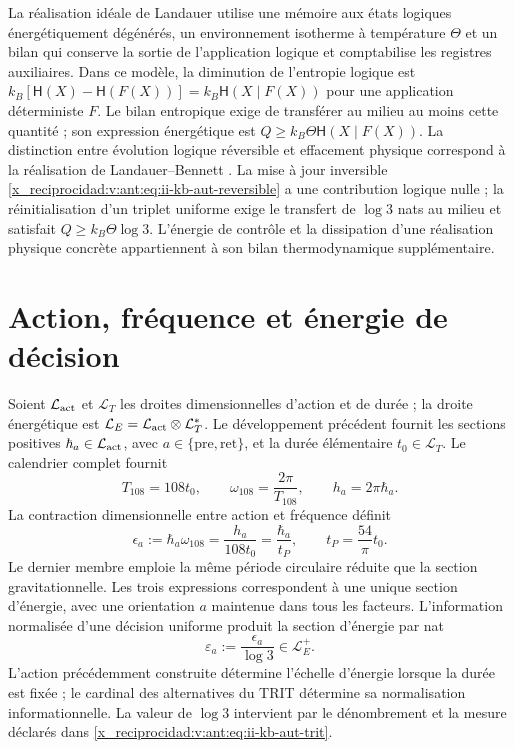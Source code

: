 La réalisation idéale de Landauer utilise une mémoire aux états logiques
énergétiquement dégénérés, un environnement isotherme à température \(\Theta\)
et un bilan qui conserve la sortie de l'application logique et comptabilise les
registres auxiliaires. Dans ce modèle, la diminution de l'entropie logique est
\(k_B[\mathsf H(X)-\mathsf H(F(X))]
=k_B\mathsf H(X\mid F(X))\) pour une application déterministe \(F\).
Le bilan entropique exige de transférer au milieu au moins cette quantité ;
son expression énergétique est \(Q\geq k_B\Theta\mathsf H(X\mid F(X))\).
La distinction entre évolution logique réversible et effacement physique
correspond à la réalisation de Landauer--Bennett \cite{x_reciprocidad:bennett2003}.
La mise à jour inversible
\eqref{x_reciprocidad:v:ant:eq:ii-kb-aut-reversible} a une contribution logique nulle ; la
réinitialisation d'un triplet uniforme exige le transfert de \(\log3\) nats
au milieu et satisfait \(Q\geq k_B\Theta\log3\).
L'énergie de contrôle et la dissipation d'une réalisation physique
concrète appartiennent à son bilan thermodynamique supplémentaire.

\section{Action, fréquence et énergie de décision}

Soient \(\mathcal L_{\rm act}\) et \(\mathcal L_T\) les droites
dimensionnelles d'action et de durée ; la droite énergétique est
\(\mathcal L_E=\mathcal L_{\rm act}\otimes\mathcal L_T^*\).
Le développement précédent fournit les sections positives
\(\hbar_a\in\mathcal L_{\rm act}\), avec
\(a\in\{\mathrm{pre},\mathrm{ret}\}\), et la durée élémentaire
\(t_0\in\mathcal L_T\). Le calendrier complet fournit
\[
 T_{108}=108t_0,\qquad
 \omega_{108}=\frac{2\pi}{T_{108}},\qquad
 h_a=2\pi\hbar_a.
\]
La contraction dimensionnelle entre action et fréquence définit
\begin{equation}
 \epsilon_a:=\hbar_a\omega_{108}
 =\frac{h_a}{108t_0}
 =\frac{\hbar_a}{t_P},\qquad
 t_P=\frac{54}{\pi}t_0.
 \label{x_reciprocidad:v:ant:eq:ii-kb-aut-energia}
\end{equation}
Le dernier membre emploie la même période circulaire réduite que la section gravitationnelle. Les trois expressions correspondent à une unique section d'énergie, avec une orientation \(a\) maintenue dans tous les facteurs. L'information normalisée d'une décision uniforme produit la section d'énergie par nat
\begin{equation}
 \varepsilon_a:=\frac{\epsilon_a}{\log3}\in\mathcal L_E^+.
 \label{x_reciprocidad:v:ant:eq:ii-kb-aut-energia-nat}
\end{equation}
L'action précédemment construite détermine l'échelle d'énergie lorsque
la durée est fixée ; le cardinal des alternatives du TRIT détermine sa
normalisation informationnelle. La valeur de \(\log3\) intervient par le
dénombrement et la mesure déclarés dans \eqref{x_reciprocidad:v:ant:eq:ii-kb-aut-trit}.

